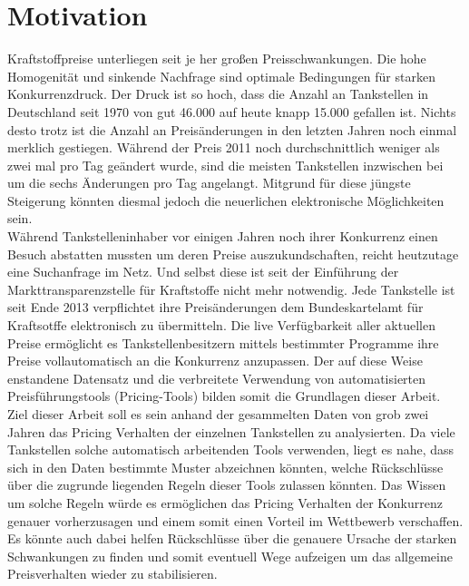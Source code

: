 \documentclass[12pt,a4paper,bibliography=totocnumbered,listof=totocnumbered]{scrartcl}
\begin{document}
\setcounter{page}{1}
\onehalfspacing
{}
\section{Motivation}
Kraftstoffpreise unterliegen seit je her großen Preisschwankungen. Die hohe Homogenität und sinkende Nachfrage sind optimale Bedingungen für starken Konkurrenzdruck. Der Druck ist so hoch, dass die Anzahl an Tankstellen in Deutschland seit 1970 von gut 46.000 auf heute knapp 15.000 gefallen ist.\cite{PraTa} Nichts desto trotz ist die Anzahl an Preisänderungen in den letzten Jahren noch einmal merklich gestiegen. Während der Preis 2011 noch durchschnittlich weniger als zwei mal pro Tag geändert wurde, sind die meisten Tankstellen inzwischen bei um die sechs Änderungen pro Tag angelangt.\cite{Unity} Mitgrund für diese jüngste Steigerung könnten diesmal jedoch die neuerlichen elektronische Möglichkeiten sein.\\

Während Tankstelleninhaber vor einigen Jahren noch ihrer Konkurrenz einen Besuch abstatten mussten um deren Preise auszukundschaften, reicht heutzutage eine Suchanfrage im Netz. Und selbst diese ist seit der Einführung der Markttransparenzstelle für Kraftstoffe nicht mehr notwendig. Jede Tankstelle ist seit Ende 2013 verpflichtet ihre Preisänderungen dem Bundeskartelamt für Kraftsotffe elektronisch zu übermitteln. Die live Verfügbarkeit aller aktuellen Preise ermöglicht es Tankstellenbesitzern mittels bestimmter Programme ihre Preise vollautomatisch an die Konkurrenz anzupassen. Der auf diese Weise enstandene Datensatz und die verbreitete Verwendung von automatisierten Preisführungstools (Pricing-Tools) bilden somit die Grundlagen dieser Arbeit.\\

Ziel dieser Arbeit soll es sein anhand der gesammelten Daten von grob zwei Jahren das Pricing Verhalten der einzelnen Tankstellen zu analysierten. Da  viele Tankstellen solche automatisch arbeitenden Tools verwenden, liegt es nahe, dass sich in den Daten bestimmte Muster abzeichnen könnten, welche Rückschlüsse über die zugrunde liegenden Regeln dieser Tools zulassen könnten. Das Wissen um solche Regeln würde es ermöglichen das Pricing Verhalten der Konkurrenz genauer vorherzusagen und einem somit einen Vorteil im Wettbewerb verschaffen. Es könnte auch dabei helfen Rückschlüsse über die genauere Ursache der starken Schwankungen zu finden und somit eventuell Wege  aufzeigen um das allgemeine Preisverhalten wieder zu stabilisieren. 
\newpage
\vspace{-1,2em}
\end{document}
